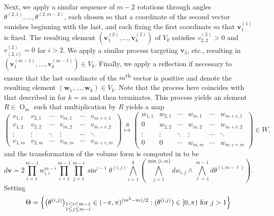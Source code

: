 \documentclass[twoside]{amsart}
\theoremstyle{definition}
\theoremstyle{remark}
\numberwithin{equation}{section}
\newcommand{\OO}{\operatorname{O}}
\begin{document}
Next, we apply a similar sequence of $m-2$ rotations through angles $\theta^{(2,1)},\ldots,\theta^{(2,m-2)}$,
each chosen so that a coordinate of the second vector vanishes beginning with the last,
and each fixing the first coordinate so that $\mathbf{v}_1^{(1)}$ is fixed. The resulting element $( \mathbf{v}_1^{(2)},\ldots,\mathbf{v}_k^{(2)} )$ of $V_k$ satisfies
$v_{2,2}^{(2)} > 0$ and $v_{(2,i)}^{(2)} = 0$ for $i > 2$. We apply a similar process targeting $\mathbf{v}_3$, etc., resulting in 
$( \mathbf{v}_1^{(m-1)},\ldots,\mathbf{v}_k^{(m-1)} ) \in V_k$. Finally, we apply a reflection if necessary to ensure that the last coordinate
of the $m$\textsuperscript{th} vector is positive and denote the resulting element $(\mathbf{w}_1,\ldots,\mathbf{w}_k)\in V_k$.
Note that the process here coincides with that described in \cite{HerbigSeatonWhitesell} for $k = m$ and then terminates.
This process yields an element $R\in\OO_m$ such that multiplication by $R$ yields a map
\[
    \begin{pmatrix}
        v_{1,1} &   v_{2,1} &   \cdots  &   v_{m,1} &   \cdots  &   v_{m+r,1}   \\
        v_{1,2} &   v_{2,2} &   \cdots  &   v_{m,2} &   \cdots  &   v_{m+r,2}   \\
        \vdots  &   \vdots  &   \ddots  &   \vdots  &   \cdots  &   \ddots      \\
        v_{1,m} &   v_{2,m} &   \cdots  &   v_{m,m} &   \cdots  &   v_{m+r,m}
    \end{pmatrix}
    \overset{R}{\mapsto}
    \begin{pmatrix}
        w_{1,1} &   w_{2,1} &   \cdots  &   w_{m,1} &   \cdots  &   w_{m+r,1}   \\
        0       &   w_{2,2} &   \cdots  &   w_{m,2} &   \cdots  &   w_{m+r,2}   \\
        \vdots  &   \vdots  &   \ddots  &   \vdots  &   \cdots  &   \ddots      \\
        0       &   0       &   \cdots  &   w_{m,m} &   \cdots  &   w_{m+r,m}
    \end{pmatrix}
    \in W,
\]
and the transformation of the volume form is computed in \cite[pp.~7]{HerbigSeatonWhitesell} to be
\[
    d\mathbf{v}
    =
    2 \prod\limits_{i=1}^{m-1} w_{i,i}^{m-i}
    \prod\limits_{i=1}^{m-1} \prod\limits_{j=1}^{m-i} \sin^{j-1}\theta^{(i,j)}
        \bigwedge\limits_{i=1}^k \left( \bigwedge\limits_{j=1}^{\min\{i,m\}} dw_{i,j}
            \wedge \bigwedge\limits_{\ell=1}^{m-1} d\theta^{(i,m-\ell)}
        \right).
\]
Setting
\[
    \Theta  =
    \Big\{ \big(\theta^{(i,j)}\big)_{\begin{subarray}{l}1\leq i\leq m-1 \\ 1\leq j\leq m-i\end{subarray}} \in (-\pi,\pi)^{(m^2-m)/2}: 
        (\theta^{(i,j)}) \in [0,\pi) \text{ for } j > 1\Big\}
\]
\end{document}
